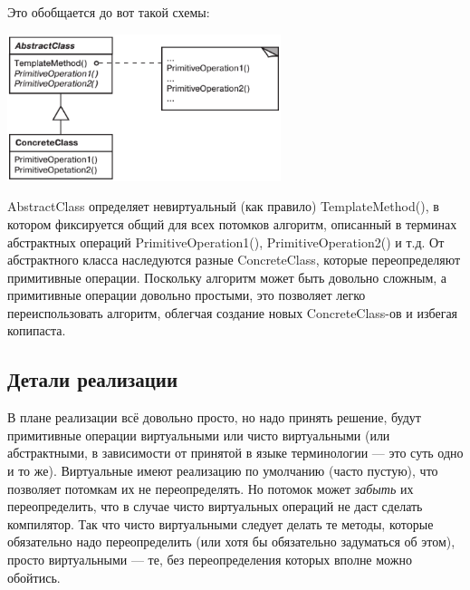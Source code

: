 \documentclass{../text-style}
\begin{document}
Это обобщается до вот такой схемы:

\begin{center}
    \includegraphics[width=0.6\textwidth]{templateMethod.png}
\end{center}

AbstractClass определяет невиртуальный (как правило) TemplateMethod(), в котором фиксируется общий для всех потомков алгоритм, описанный в терминах абстрактных операций PrimitiveOperation1(), PrimitiveOperation2() и т.д. От абстрактного класса наследуются разные ConcreteClass, которые переопределяют примитивные операции. Поскольку алгоритм может быть довольно сложным, а примитивные операции довольно простыми, это позволяет легко переиспользовать алгоритм, облегчая создание новых ConcreteClass-ов и избегая копипаста.

\subsection{Детали реализации}

В плане реализации всё довольно просто, но надо принять решение, будут примитивные операции виртуальными или чисто виртуальными (или абстрактными, в зависимости от принятой в языке терминологии --- это суть одно и то же). Виртуальные имеют реализацию по умолчанию (часто пустую), что позволяет потомкам их не переопределять. Но потомок может \emph{забыть} их переопределить, что в случае чисто виртуальных операций не даст сделать компилятор. Так что чисто виртуальными следует делать те методы, которые обязательно надо переопределить (или хотя бы обязательно задуматься об этом), просто виртуальными --- те, без переопределения которых вполне можно обойтись.
\end{document}
